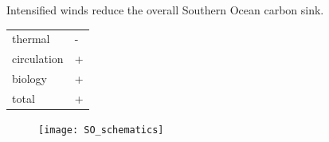 \documentclass[aspectratio=169]{beamer}
\begin{document}
\begin{frame}{Intensified winds reduce the overall Southern Ocean carbon sink.}
	\begin{minipage}{.32\textwidth}		
		
		\begin{table}
		\begin{tabular}{l l}
		thermal & - \\
		circulation & + \\
		biology & + \\ \hline
		total & +
		\end{tabular}		
		\end{table}
			\end{minipage} \hfill
	\begin{minipage}{.65\textwidth}	
	
	\begin{figure}[h!]
			\centering
			
			\texttt{[image: SO\_schematics]}		
			\label{fig:schematics_neg_all}
		\end{figure}	
		\end{minipage}

\end{frame}
\end{document}
